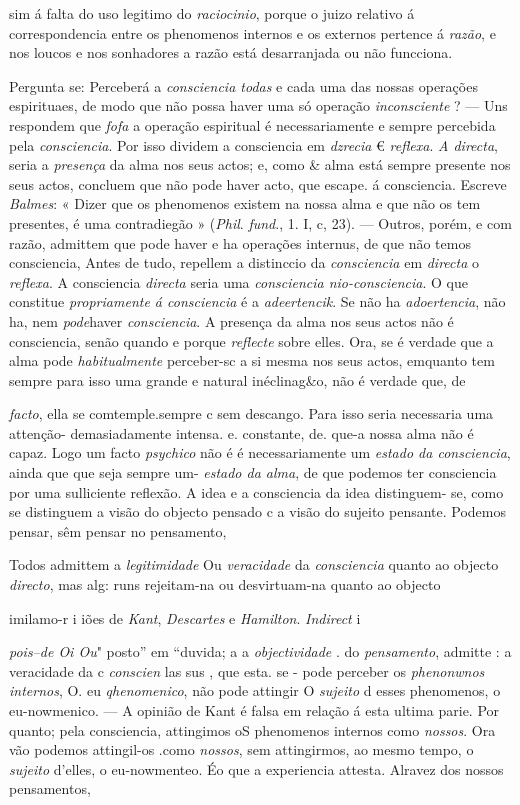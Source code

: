 sim á falta do uso legitimo do \emph{raciocinio}, porque o juizo relativo á correspondencia entre os phenomenos internos e os externos pertence á \emph{razão}, e nos loucos e nos sonhadores a razão está desarranjada ou não funcciona.\par Pergunta se: Perceberá a \emph{consciencia todas} e cada uma das nossas operações espirituaes, de modo que não possa haver uma só operação \emph{inconsciente} ? --- Uns respondem que \emph{fofa} a operação espiritual é necessariamente e sempre percebida pela \emph{consciencia}. Por isso dividem a consciencia em \emph{dzrecia} € \emph{reflexa}. \emph{A directa}, seria a \emph{presença} da alma nos seus actos; e, como \& alma está sempre presente nos seus actos, concluem que não pode haver acto, que escape. á consciencia. Escreve \emph{Balmes}: « Dizer que os phenomenos existem na nossa alma e que não os tem presentes, é uma contradiegão » (\emph{Phil}. \emph{fund}., 1. I, c, 23). --- Outros, porém, e com razão, admittem que pode haver e ha operações internus, de que não temos consciencia, Antes de tudo, repellem a distinccio da \emph{consciencia} em \emph{directa} o \emph{reflexa}. A consciencia \emph{directa} seria uma \emph{consciencia nio-consciencia}. O que constitue \emph{propriamente á consciencia} é a \emph{adeertencik}. Se não ha \emph{adoertencia}, não ha, nem \emph{pode}haver \emph{consciencia}. A presença da alma nos seus actos não é consciencia, senão quando e porque \emph{reflecte} sobre elles. Ora, se é verdade que a alma pode \emph{habitualmente} perceber-sc a si mesma nos seus actos, emquanto tem sempre para isso uma grande e natural inéclinag\&o, não é verdade que, de\par \emph{facto}, ella se comtemple.sempre c sem descango. Para isso seria necessaria uma attenção- demasiadamente intensa. e. constante, de. que-a nossa alma não é capaz. Logo um facto \emph{psychico} não é é necessariamente um \emph{estado da consciencia}, ainda que que seja sempre um- \emph{estado da alma}, de que podemos ter consciencia por uma sulliciente reflexão. A idea e a consciencia da idea distinguem- se, como se distinguem a visão do objecto pensado c a visão do sujeito pensante. Podemos pensar, sêm pensar no pensamento,\par Todos admittem a \emph{legitimidade} Ou \emph{veracidade} da \emph{consciencia} quanto ao objecto \emph{directo}, mas alg: runs rejeitam-na ou desvirtuam-na quanto ao objecto\par imilamo-r i iões de \emph{Kant}, \emph{Descartes} e \emph{Hamilton}. \emph{Indirect} i\par \emph{pois--de Oi Ou}" posto” em “duvida; a a \emph{objectividade} . do \emph{pensamento}, admitte : a veracidade da c \emph{conscien} las sus , que esta. se - pode perceber os \emph{phenonwnos internos}, O. eu \emph{qhenomenico}, não pode attingir O \emph{sujeito} d esses phenomenos, o eu-nowmenico. --- A opinião de Kant é falsa em relação á esta ultima parie. Por quanto; pela consciencia, attingimos oS phenomenos internos como \emph{nossos}. Ora vão podemos attingil-os .como \emph{nossos}, sem attingirmos, ao mesmo tempo, o \emph{sujeito} d'elles, o eu-nowmenteo. Éo que a experiencia attesta. Alravez dos nossos pensamentos, 